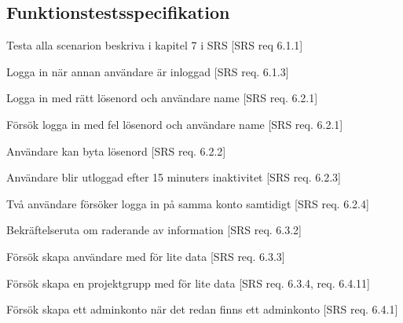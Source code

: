 \documentclass[a4paper]{article}
\begin{document}
\begin{appendices}

\section{Funktionstestsspecifikation}


\begin{FT}

\item 

Testa alla scenarion beskriva i kapitel 7 i SRS [SRS req 6.1.1]

\item 

Logga in när annan användare är inloggad [SRS req. 6.1.3]

\item 

Logga in med rätt lösenord och användare name [SRS req. 6.2.1]

\item 

Försök logga in med fel lösenord och användare name [SRS req. 6.2.1]


\item 

Användare kan byta lösenord [SRS req. 6.2.2]

\item 

Användare blir utloggad efter 15 minuters inaktivitet [SRS req. 6.2.3]

\item 

Två användare försöker logga in på samma konto samtidigt [SRS req. 6.2.4]

\item 

Bekräftelseruta om raderande av information [SRS req. 6.3.2]

\item 

Försök skapa användare med för lite data [SRS req. 6.3.3]

\item 

Försök skapa en projektgrupp med för lite data [SRS req. 6.3.4, req. 6.4.11]

\item 

Försök skapa ett adminkonto när det redan finns ett adminkonto [SRS req. 6.4.1]

\item 


\end{FT}
\end{appendices}
\end{document}
